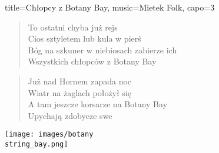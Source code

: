 \begin{song}{title={Chłopcy z Botany Bay}, music={Mietek Folk}, capo=3}
\begin{multicols}{2}
\begin{verse}
    \end{verse}
    \begin{verse}
        To ostatni chyba już rejs \\
        Cios sztyletem lub kula w pierś \\
        Bóg na szkuner w niebiosach zabierze ich \\
        Wszystkich chłopców z Botany Bay
    \end{verse}
    \begin{verse}
        Już nad Hornem zapada noc \\
        Wiatr na żaglach położył się \\
        A tam jeszcze korsarze na Botany Bay \\
        Upychają zdobycze swe
    \end{verse}
\end{multicols}
\begin{center}
    \texttt{[image: images/botany\\string\_bay.png]}
\end{center}
\end{song}

